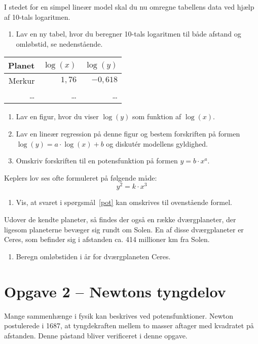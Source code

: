 \documentclass[12pt,oneside,a4paper]{article}
\theoremstyle{plain}
\begin{document}
I stedet for en simpel lineær model skal du nu omregne tabellens data ved hjælp af 
10-tals logaritmen.
\begin{enumerate}[label=(\alph*) ,resume]
    \item Lav en ny tabel, hvor du beregner 10-tals logaritmen til både afstand
        og omløbstid, se nedenstående.
\end{enumerate}

\begin{center}
\begin{tabular}{r|r|r}
    \hline
    Planet  & $\log(x)$   & $\log(y)$ \\
    \hline 
    Merkur  &  $1,76$ &   $-0,618$ \\
    \ldots  & \ldots    & \ldots  \\
    \hline 
\end{tabular}
\end{center}

\begin{enumerate}[label=(\alph*) ,resume]
    \item Lav en figur, hvor du viser $\log(y)$ som funktion af $\log(x)$.
    \item Lav en lineær regression på denne figur og bestem forskriften på formen
        $\log(y) = a\cdot\log(x)+b$ og diskutér modellens gyldighed.
    \item Omskriv forskriften til en potensfunktion på formen $y = b\cdot x^a$. \label{pot}
\end{enumerate}

Keplers lov ses ofte formuleret på følgende måde:
$$
y^2 = k \cdot x^3
$$
\begin{enumerate}[label=(\alph*) ,resume]
    \item Vis, at svaret i spørgsmål~\ref{pot} kan omskrives til ovenstående formel.
\end{enumerate}


Udover de kendte planeter, så findes der også en række dværgplaneter, der
ligesom planeterne bevæger sig rundt om Solen. En af disse dværgplaneter er
Ceres, som befinder sig i afstanden ca. 414 millioner km fra Solen.

\begin{enumerate}[label=(\alph*) ,resume]
    \item Beregn omløbstiden i år for dværgplaneten Ceres.
\end{enumerate}

\section*{Opgave 2 -- Newtons tyngdelov}
Mange sammenhænge i fysik kan beskrives ved potensfunktioner. Newton
postulerede i 1687, at tyngdekraften mellem to masser aftager med kvadratet på
afstanden.  Denne påstand bliver verificeret i denne opgave.
\end{document}

